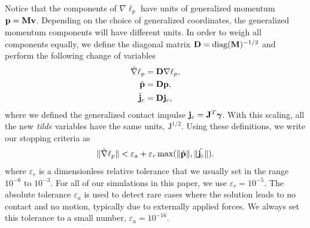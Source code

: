 Notice that the components of $\nabla\ell_p$ have units of generalized momentum
${\mathbf{p}}={\mathbf{M}}{\mathbf{v}}$. Depending on the choice of generalized coordinates, the
generalized momentum components will have different units. In order to weigh all
components equally, we define the diagonal matrix ${\mathbf{D}} =
\text{diag}({\mathbf{M}})^{-1/2}$ and perform the following change of variables
\begin{align}
	\tilde{\nabla}\ell_p &= \mf{D}\nabla\ell_p, \nonumber\\
	\tilde{\mf{p}} &= \mf{D}\mf{p}, \nonumber \\
	\tilde{\mf{j}}_c &= \mf{D}\mf{j}_c,
	\label{eq:scaled_momentum_quantities}
\end{align}
where we defined the generalized contact impulse ${\mathbf{j}}_c={\mathbf{J}}^T{\bm\gamma}$.
With this scaling, all the new \emph{tilde} variables have the same units,
$\text{J}^{1/2}$. Using these definitions, we write our stopping criteria as
\begin{equation}
	\Vert\tilde{\nabla}\ell_p\Vert < \varepsilon_a + \varepsilon_r\max(\Vert\tilde{\mf{p}}\Vert,\Vert\tilde{\mf{j}_c}\Vert).
	\label{eq:stopping_criteria}
\end{equation}
where $\varepsilon_r$ is a dimensionless relative tolerance that we usually set
in the range $10^{-6}$ to $10^{-3}$. For all of our simulations in this paper,
we use $\varepsilon_r = 10^{-5}$. The absolute tolerance $\varepsilon_a$ is used
to detect rare cases where the solution leads to no contact and no motion,
typically due to externally applied forces. We always set this tolerance to a
small number, $\varepsilon_a=10^{-16}$.
